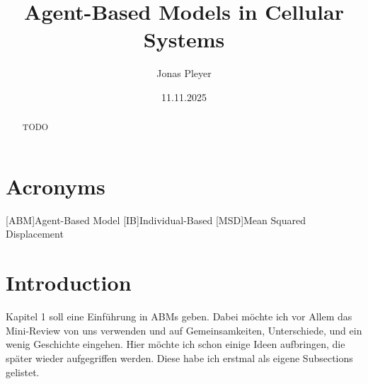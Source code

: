 \usepackage[utf8]{inputenc}

\usepackage{acronym}
\usepackage{amsmath}
\usepackage[USenglish]{babel}
\usepackage[style=ieee]{biblatex}
\usepackage{color}
\usepackage{float}
\usepackage{graphicx}
\usepackage{hyperref}
\usepackage{listings}
\usepackage{listings-rust/listings-rust}
\usepackage{parskip}
\usepackage{siunitx}




\makeatletter
\title{Agent-Based Models in Cellular Systems}\let\Title\@title
\author{Jonas Pleyer}\let\Author\@author
\date{11.11.2025}\let\Date\@date
\makeatother





\begin{abstract}
    TODO
\end{abstract}

\newpage
\tableofcontents
{}
\newpage

\listoffigures
\listoftables
\lstlistoflistings

\section*{Acronyms}
\begin{acronym}
    [ABM]{Agent-Based Model}
    [IB]{Individual-Based}
    [MSD]{Mean Squared Displacement}
\end{acronym}

\newpage
{}
\section{Introduction}

Kapitel 1 soll eine Einführung in ABMs geben. Dabei möchte ich vor Allem das Mini-Review
von uns verwenden und auf Gemeinsamkeiten, Unterschiede, und ein wenig Geschichte
eingehen. Hier möchte ich schon einige Ideen aufbringen, die später wieder aufgegriffen
werden. Diese habe ich erstmal als eigene Subsections gelistet.

